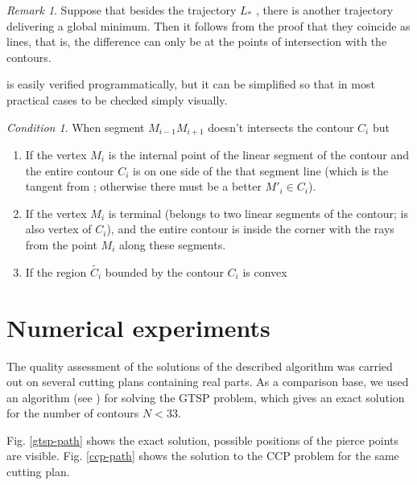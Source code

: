 \documentclass[]{interact}
\theoremstyle{plain}%
\theoremstyle{definition}
\theoremstyle{remark}
\newtheorem{remark}{Remark}
\newtheorem{condition}{Condition}
\begin{document}
\begin{remark}
Suppose that besides the trajectory
$L_*$ ,
there is another trajectory delivering a global minimum.
Then it follows from the proof
that they coincide as lines,
that is,
the difference can only be at
the points of intersection with the contours.
\end{remark}

is easily verified programmatically,
but it can be simplified
so that in most practical cases
to be checked simply visually.

\begin{condition}
When segment
$M_{i-1} M_{i+1}$
doesn't intersects the contour
$C_i$ but
\begin{enumerate}
  \item
  If the vertex
  $M_i$
  is the internal point of the linear segment of the contour
  and the entire contour
  $C_i$
  is on one side of the that segment line
  (which is the tangent from ;
  otherwise there must be a better
  $M'_i\in C_i$).
  \item
  If the vertex
  $M_i$ is terminal
  (belongs to two linear segments of the contour;
  is also vertex of $C_i$),
  and the entire contour is inside
  the corner with the rays from the point
  $M_i$ along these segments.
  \item
  If the region
  $\tilde{C_i}$
  bounded by the contour
  $C_i$ is convex
\end{enumerate}
\end{condition}

\section{Numerical experiments}

The quality assessment of the solutions
of the described algorithm was carried out on several
cutting plans containing real parts.
As a comparison base, we used an algorithm
(see \cite{bi15})
for solving the GTSP problem, which gives an exact solution for the number of contours
$N <33$.

Fig. \ref{gtsp-path} shows the exact solution,
possible positions of the pierce points are visible.
Fig. \ref{ccp-path} shows the solution to the CCP problem
for the same cutting plan.
\end{document}

